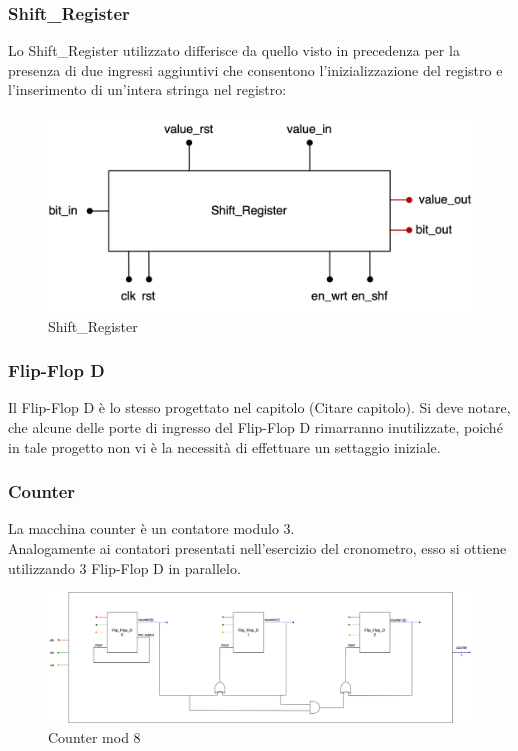 \subsubsection{Shift\_Register}
Lo Shift\_Register utilizzato differisce da quello visto in precedenza per la presenza di due ingressi aggiuntivi che consentono l'inizializzazione del registro e l'inserimento di un'intera stringa nel registro:

\begin{figure}[H]
	\centering
	\includegraphics[width=1\textwidth]{img/Esercizio_7_1/Shift_Register_booth.png}
	\caption{Shift\_Register}
	\label{sh_booth} 
\end{figure}

\subsubsection{Flip-Flop D}
Il Flip-Flop D è lo stesso progettato nel capitolo (Citare capitolo).
Si deve notare, che alcune delle porte di ingresso del Flip-Flop D rimarranno inutilizzate, poiché in tale progetto non vi è la necessità di effettuare un settaggio iniziale.

\subsubsection{Counter}
La macchina counter è un contatore modulo 3.\\
Analogamente ai contatori presentati nell'esercizio del cronometro, esso si ottiene utilizzando 3 Flip-Flop D in parallelo.\\

\begin{figure}[H]
	\centering
	\includegraphics[width=1\textwidth]{img/Esercizio_7_1/counter_mod_8.png}
	\caption{Counter mod 8}
	\label{cnt_mod_8} 
\end{figure}


